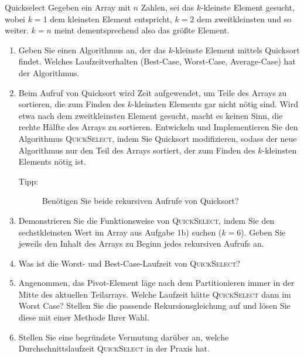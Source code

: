 \documentclass[11pt,a4paper]{article}
\begin{document}
\begin{aufgabe}{5}{Quickselect}
    Gegeben ein Array mit $n$ Zahlen, sei das $k$-kleinste Element gesucht, wobei $k = 1$ dem kleinsten Element entspricht, $k = 2$ dem zweitkleinsten und so weiter.
    $k = n$ meint dementsprechend also das größte Element.
    \begin{enumerate}
        \item Geben Sie einen Algorithmus an, der das $k$-kleinste Element mittels Quicksort findet. Welches Laufzeitverhalten (Best-Case, Worst-Case, Average-Case) hat der Algorithmus.

        \item Beim Aufruf von Quicksort wird Zeit aufgewendet, um Teile des Arrays zu sortieren, die zum Finden des $k$-kleinsten Elements gar nicht nötig sind.
        Wird etwa nach dem zweitkleinsten Element gesucht, macht es keinen Sinn, die rechte Hälfte des Arrays zu sortieren.
        Entwickeln und Implementieren Sie den Algorithmus \textsc{QuickSelect}, indem Sie Quicksort modifizieren, sodass der neue Algorithmus nur den Teil des Arrays sortiert, der zum Finden des $k$-kleinsten Elements nötig ist.
        \begin{description}
            \item[Tipp:] Benötigen Sie beide rekursiven Aufrufe von Quicksort?
        \end{description}

        \item Demonstrieren Sie die Funktionsweise von \textsc{QuickSelect}, indem Sie den sechstkleinsten Wert im Array aus Aufgabe 1b) suchen ($k = 6$). Geben Sie jeweils den Inhalt des Arrays zu Beginn jedes rekursiven Aufrufs an.

        \item Was ist die Worst- und Best-Case-Laufzeit von \textsc{QuickSelect}?

        \item Angenommen, das Pivot-Element läge nach dem Partitionieren immer in der Mitte des aktuellen Teil\-arrays. 
        Welche Laufzeit hätte \textsc{QuickSelect} dann im Worst Case?
        Stellen Sie die passende Rekursionsgleichung auf und lösen Sie diese mit einer Methode Ihrer Wahl.

        \item Stellen Sie eine begründete Vermutung darüber an, welche Durchschnittslaufzeit \textsc{QuickSelect} in der Praxis hat.
    \end{enumerate}
\end{aufgabe}
\end{document}
